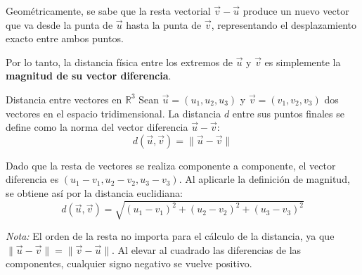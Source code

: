 Geométricamente, se sabe que la resta vectorial $\vec{v} - \vec{u}$ produce un nuevo vector que va desde la punta de $\vec{u}$ hasta la punta de $\vec{v}$, representando el desplazamiento exacto entre ambos puntos. 

Por lo tanto, la distancia física entre los extremos de $\vec{u}$ y $\vec{v}$ es simplemente la \textbf{magnitud de su vector diferencia}.

\begin{mydefinition}{Distancia entre vectores en $\mathbb{R}^3$}
Sean $\vec{u} = (u_1, u_2, u_3)$ y $\vec{v} = (v_1, v_2, v_3)$ dos vectores en el espacio tridimensional. La distancia $d$ entre sus puntos finales se define como la norma del vector diferencia $\vec{u} - \vec{v}$:
\[ d(\vec{u}, \vec{v}) = \|\vec{u} - \vec{v}\| \]
    
Dado que la resta de vectores se realiza componente a componente, el vector diferencia es $(u_1 - v_1, u_2 - v_2, u_3 - v_3)$. Al aplicarle la definición de magnitud, se obtiene así por la distancia euclidiana:
\[ d(\vec{u}, \vec{v}) = \sqrt{(u_1 - v_1)^2 + (u_2 - v_2)^2 + (u_3 - v_3)^2} \]

\textit{Nota:} El orden de la resta no importa para el cálculo de la distancia, ya que $\|\vec{u} - \vec{v}\| = \|\vec{v} - \vec{u}\|$. Al elevar al cuadrado las diferencias de las componentes, cualquier signo negativo se vuelve positivo.
\end{mydefinition}

\begin{center}
\shorthandoff{>}
\end{center}

